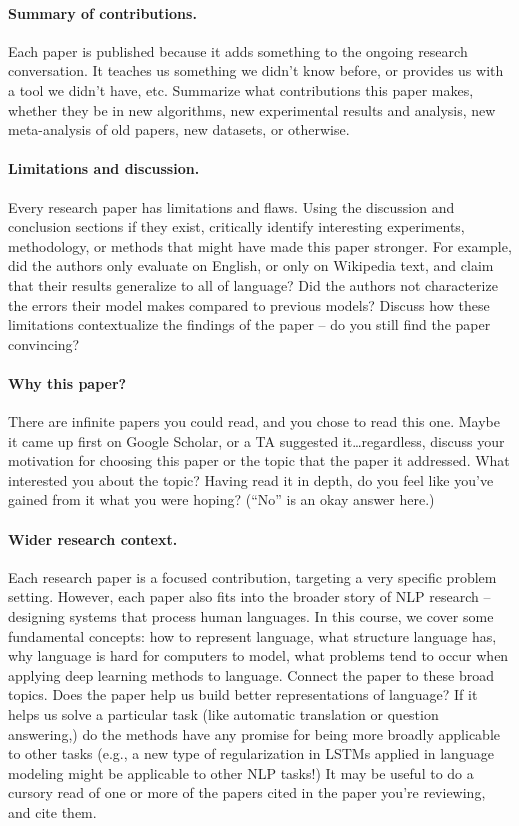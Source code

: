 \documentclass{article}
\begin{document}
\paragraph{Summary of contributions.}
Each paper is published because it adds something to the ongoing research conversation. It teaches us something we didn't know before, or provides us with a tool we didn't have, etc.
Summarize what contributions this paper makes, whether they be in new algorithms, new experimental results and analysis, new meta-analysis of old papers, new datasets, or otherwise.

\paragraph{Limitations and discussion.}
Every research paper has limitations and flaws.
Using the discussion and conclusion sections if they exist, critically identify interesting experiments, methodology, or methods that might have made this paper stronger.
For example, did the authors only evaluate on English, or only on Wikipedia text, and claim that their results generalize to all of language?
Did the authors not characterize the errors their model makes compared to previous models?
Discuss how these limitations contextualize the findings of the paper -- do you still find the paper convincing?

\paragraph{Why this paper?}
There are infinite papers you could read, and you chose to read this one.
Maybe it came up first on Google Scholar, or a TA suggested it\dots regardless, discuss your motivation for choosing this paper or the topic that the paper it addressed.
What interested you about the topic?
Having read it in depth, do you feel like you've gained from it what you were hoping? (``No'' is an okay answer here.)

\paragraph{Wider research context.}
Each research paper is a focused contribution, targeting a very specific problem setting.
However, each paper also fits into the broader story of NLP research -- designing systems that process human languages.
In this course, we cover some fundamental concepts: how to represent language, what structure language has, why language is hard for computers to model, what problems tend to occur when applying deep learning methods to language.
Connect the paper to these broad topics.
Does the paper help us build better representations of language?
If it helps us solve a particular task (like automatic translation or question answering,) do the methods have any promise for being more broadly applicable to other tasks (e.g., a new type of regularization in LSTMs applied in language modeling might be applicable to other NLP tasks!)
It may be useful to do a cursory read of one or more of the papers cited in the paper you're reviewing, and cite them.
\end{document}
